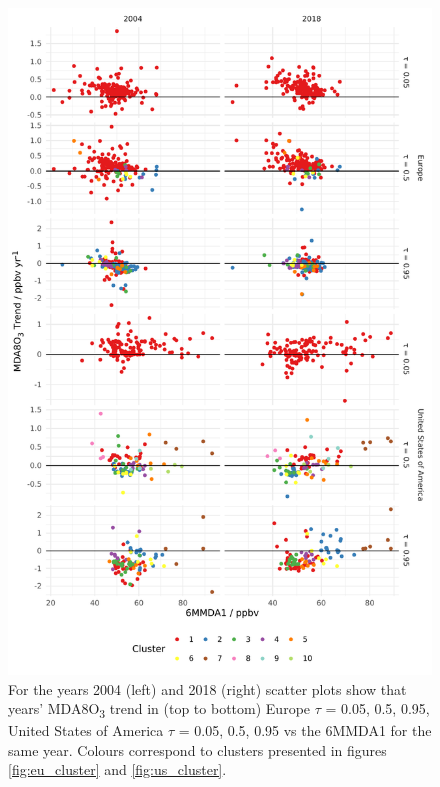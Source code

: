 \documentclass[journal abbreviation, manuscript]{copernicus}
\begin{document}
\clearpage


\begin{figure}[p]
\centering
\includegraphics[height=0.9\textheight]{figures/paper_figures/f09_mda8_cluster_mda8_6mmda1.pdf}
\caption{For the years 2004 (left) and 2018 (right) scatter plots show that years' MDA8O\textsubscript{3} trend in (top to bottom) Europe $\tau$ = 0.05, 0.5, 0.95, United States of America $\tau$ = 0.05, 0.5, 0.95 vs the 6MMDA1 for the same year. Colours correspond to clusters presented in figures \ref{fig:eu_cluster} and \ref{fig:us_cluster}.}
\label{fig:mda8_cluster_mda8_6mmda1}
\end{figure}
\clearpage
\end{document}
